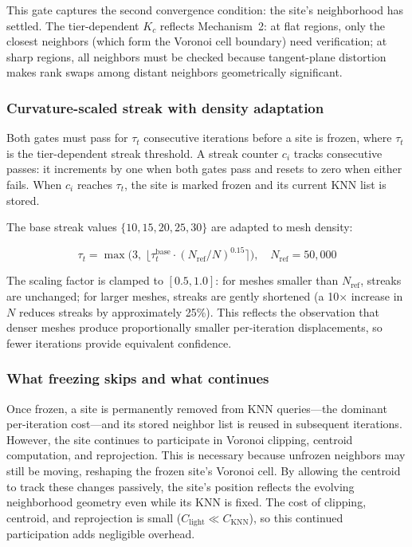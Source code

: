 This gate captures the second convergence condition: the site's neighborhood has settled. The tier-dependent $K_c$ reflects Mechanism~2: at flat regions, only the closest neighbors (which form the Voronoi cell boundary) need verification; at sharp regions, all neighbors must be checked because tangent-plane distortion makes rank swaps among distant neighbors geometrically significant.

\subsubsection{Curvature-scaled streak with density adaptation}

Both gates must pass for $\tau_t$ consecutive iterations before a site is frozen, where $\tau_t$ is the tier-dependent streak threshold. A streak counter $c_i$ tracks consecutive passes: it increments by one when both gates pass and resets to zero when either fails. When $c_i$ reaches $\tau_t$, the site is marked frozen and its current KNN list is stored.

The base streak values $\{10, 15, 20, 25, 30\}$ are adapted to mesh density:

$$\tau_t = \max\!\Big(3,\; \big\lfloor \tau_t^{\mathrm{base}} \cdot (N_{\mathrm{ref}} / N)^{0.15} \big\rceil\Big), \quad N_{\mathrm{ref}} = 50{,}000$$

The scaling factor is clamped to $[0.5, 1.0]$: for meshes smaller than $N_{\mathrm{ref}}$, streaks are unchanged; for larger meshes, streaks are gently shortened (a 10$\times$ increase in $N$ reduces streaks by approximately 25\%). This reflects the observation that denser meshes produce proportionally smaller per-iteration displacements, so fewer iterations provide equivalent confidence.

\subsubsection{What freezing skips and what continues}

Once frozen, a site is permanently removed from KNN queries---the dominant per-iteration cost---and its stored neighbor list is reused in subsequent iterations. However, the site continues to participate in Voronoi clipping, centroid computation, and reprojection. This is necessary because unfrozen neighbors may still be moving, reshaping the frozen site's Voronoi cell. By allowing the centroid to track these changes passively, the site's position reflects the evolving neighborhood geometry even while its KNN is fixed. The cost of clipping, centroid, and reprojection is small ($C_{\mathrm{light}} \ll C_{\mathrm{KNN}}$), so this continued participation adds negligible overhead.

